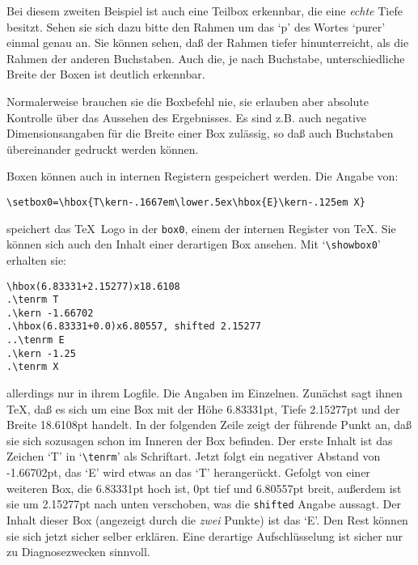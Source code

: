 \medskip

Bei diesem zweiten Beispiel ist auch eine Teilbox erkennbar, die eine
{\em echte} Tiefe besitzt. Sehen sie sich dazu bitte den Rahmen um das
`p' des Wortes `purer' einmal genau an. Sie k\"onnen sehen, da\ss{} der
Rahmen tiefer hinunterreicht, als die Rahmen der anderen Buchstaben.
Auch die, je nach Buchstabe, unterschiedliche Breite der Boxen ist
deutlich erkennbar.

Normalerweise brauchen sie die Boxbefehl nie, sie erlauben aber
absolute Kontrolle \"uber das Aussehen des Ergebnisses. Es sind z.B.
auch negative 
Dimensionsangaben f\"ur die Breite einer Box zul\"assig, so
da\ss{} auch Buchstaben \"ubereinander gedruckt werden k\"onnen.

Boxen k\"onnen auch in internen 
Registern gespeichert werden. Die Angabe
von:
\begin{verbatim}
\setbox0=\hbox{T\kern-.1667em\lower.5ex\hbox{E}\kern-.125em X}
\end{verbatim}
speichert das \TeX\ Logo in der {\tt box0}, einem der internen
Register von \TeX. Sie k\"onnen sich auch den Inhalt einer derartigen
Box ansehen. Mit 
`\verb|\showbox0|' erhalten sie:
\begin{verbatim}
\hbox(6.83331+2.15277)x18.6108
.\tenrm T
.\kern -1.66702
.\hbox(6.83331+0.0)x6.80557, shifted 2.15277
..\tenrm E
.\kern -1.25
.\tenrm X
\end{verbatim}
allerdings nur in ihrem 
Logfile. Die Angaben im Einzelnen. Zun\"achst
sagt ihnen \TeX, da\ss{} es sich um eine Box mit der
H\"ohe 6.83331pt, Tiefe
2.15277pt und der Breite 18.6108pt handelt. In der folgenden Zeile
zeigt der f\"uhrende 
Punkt an, da\ss{} sie sich sozusagen schon im Inneren
der Box befinden. Der erste Inhalt ist das Zeichen `T' in
`\verb|\tenrm|' als 
Schriftart. Jetzt folgt ein negativer
Abstand von
-1.66702pt, das `E' wird etwas an das `T' heranger\"uckt. Gefolgt von
einer weiteren Box, die 6.83331pt hoch ist, 0pt tief und 6.80557pt
breit, au\ss{}erdem ist sie um 2.15277pt nach unten verschoben, was die
{\tt shifted} Angabe aussagt. Der Inhalt dieser Box (angezeigt durch
die {\em zwei} 
Punkte) ist das `E'. Den Rest k\"onnen sie sich jetzt
sicher selber erkl\"aren. Eine derartige Aufschl\"usselung ist sicher nur
zu Diagnosezwecken sinnvoll.

